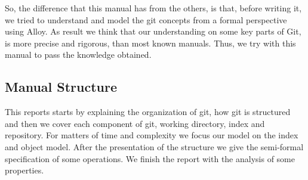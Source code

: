 So, the difference that this manual has from the others, is
that, before writing it, we tried to understand and model 
the git concepts from a formal perspective using Alloy. As result 
we think that our understanding on some key parts of Git, is more precise
and rigorous, than most known manuals. Thus, we try with this manual
to pass the knowledge obtained. \par 

\subsection{Manual Structure}
This reports starts by explaining the organization of git, how git is
structured and then we cover each component of git, working directory,
index and repository. For matters
of time and complexity we focus our model on the index and object
model. After the presentation of the structure we give the semi-formal
specification of some operations. We finish the report with the
analysis of some properties.


